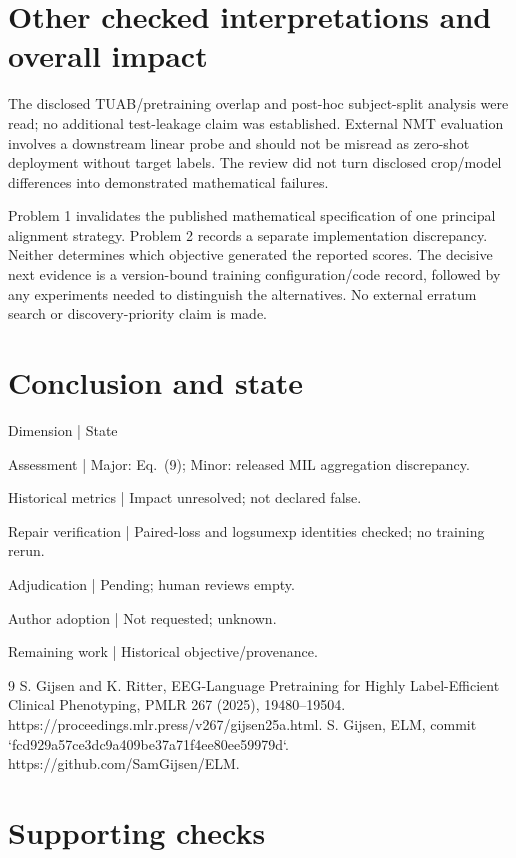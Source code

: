 \documentclass[10pt]{article}
\begin{document}
\section*{Other checked interpretations and overall impact}
The disclosed TUAB/pretraining overlap and post-hoc subject-split analysis were read; no additional test-leakage claim was established. External NMT evaluation involves a downstream linear probe and should not be misread as zero-shot deployment without target labels. The review did not turn disclosed crop/model differences into demonstrated mathematical failures.\par
Problem 1 invalidates the published mathematical specification of one principal alignment strategy. Problem 2 records a separate implementation discrepancy. Neither determines which objective generated the reported scores. The decisive next evidence is a version-bound training configuration/code record, followed by any experiments needed to distinguish the alternatives. No external erratum search or discovery-priority claim is made.\par
\section*{Conclusion and state}
Dimension | State\par
Assessment | Major: Eq. (9); Minor: released MIL aggregation discrepancy.\par
Historical metrics | Impact unresolved; not declared false.\par
Repair verification | Paired-loss and logsumexp identities checked; no training rerun.\par
Adjudication | Pending; human reviews empty.\par
Author adoption | Not requested; unknown.\par
Remaining work | Historical objective/provenance.\par
9 S. Gijsen and K. Ritter, EEG-Language Pretraining for Highly Label-Efficient Clinical Phenotyping, PMLR 267 (2025), 19480–19504. https://proceedings.mlr.press/v267/gijsen25a.html. S. Gijsen, ELM, commit `fcd929a57ce3dc9a409be37a71f4ee80ee59979d`. https://github.com/SamGijsen/ELM.\par
\section*{Supporting checks}
\end{document}
